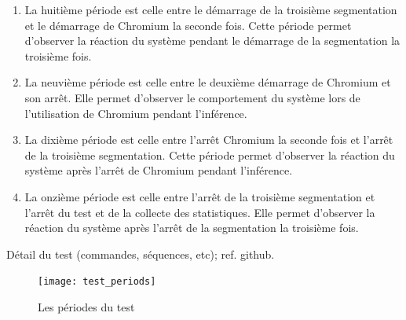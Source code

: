 \begin{enumerate}
   \item La huitième période est celle entre le démarrage de la troisième segmentation et le démarrage de Chromium la seconde fois. Cette période permet d'observer la réaction du système pendant le démarrage de la segmentation la troisième fois. 
   \item La neuvième période est celle entre le deuxième démarrage de Chromium et son arrêt. Elle permet d'observer le comportement du système lors de l'utilisation de Chromium pendant l'inférence.
   \item La dixième période est celle entre l'arrêt Chromium la seconde fois et l'arrêt de la troisième segmentation. Cette période permet d'observer la réaction du système après l'arrêt de Chromium pendant l'inférence. 
   \item La onzième période est celle entre l'arrêt de la troisième segmentation et l'arrêt du test et de la collecte des statistiques. Elle permet d'observer la réaction du système après l'arrêt de la segmentation la troisième fois. 
\end{enumerate} 
{\color{red}
\par Détail du test (commandes, séquences, etc); ref. github. 
}
\begin{figure}[H]
   \centering
   \texttt{[image: test\_periods]}
   \caption{Les périodes du test}
   \label{fig:test_periods}
\end{figure}
